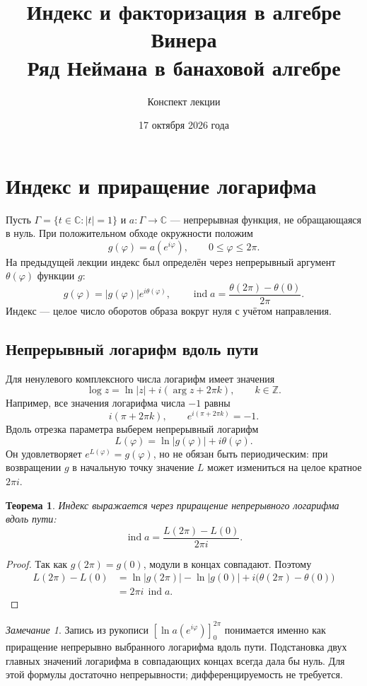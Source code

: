 \documentclass[12pt,a4paper]{article}
\title{Индекс и факторизация в алгебре Винера\\Ряд Неймана в банаховой алгебре}
\author{Конспект лекции}
\date{17 октября 2026 года}
\newtheorem{theorem}{Теорема}
\theoremstyle{definition}
\theoremstyle{remark}
\newtheorem*{remark}{Замечание}
\newcommand{\CC}{\mathbb{C}}
\newcommand{\ZZ}{\mathbb{Z}}
\DeclareMathOperator{\ind}{ind}
\begin{document}
\maketitle

\section{Индекс и приращение логарифма}

Пусть $\Gamma=\{t\in\CC:|t|=1\}$ и $a\colon\Gamma\to\CC$ ---
непрерывная функция, не обращающаяся в нуль. При положительном обходе
окружности положим
\[
  g(\varphi)=a(e^{i\varphi}),\qquad 0\leqslant\varphi\leqslant2\pi.
\]
На предыдущей лекции индекс был определён через непрерывный аргумент
$\theta(\varphi)$ функции $g$:
\[
  g(\varphi)=|g(\varphi)|e^{i\theta(\varphi)},\qquad
  \ind a=\frac{\theta(2\pi)-\theta(0)}{2\pi}.
\]
Индекс --- целое число оборотов образа вокруг нуля с учётом направления.

\subsection{Непрерывный логарифм вдоль пути}

Для ненулевого комплексного числа логарифм имеет значения
\[
  \log z=\ln|z|+i(\arg z+2\pi k),\qquad k\in\ZZ.
\]
Например, все значения логарифма числа $-1$ равны
\[
  i(\pi+2\pi k),\qquad
  e^{i(\pi+2\pi k)}=-1.
\]
Вдоль отрезка параметра выберем непрерывный логарифм
\[
  L(\varphi)=\ln|g(\varphi)|+i\theta(\varphi).
\]
Он удовлетворяет $e^{L(\varphi)}=g(\varphi)$, но не обязан быть
периодическим: при возвращении $g$ в начальную точку значение $L$
может измениться на целое кратное $2\pi i$.

\begin{theorem}
Индекс выражается через приращение непрерывного логарифма вдоль пути:
\[
  \boxed{\ind a=\frac{L(2\pi)-L(0)}{2\pi i}}.
\]
\end{theorem}

\begin{proof}
Так как $g(2\pi)=g(0)$, модули в концах совпадают. Поэтому
\begin{align*}
  L(2\pi)-L(0)
  &=\ln|g(2\pi)|-\ln|g(0)|
    +i\bigl(\theta(2\pi)-\theta(0)\bigr)\\
  &=2\pi i\,\ind a.
\end{align*}
\end{proof}

\begin{remark}
Запись из рукописи $[\ln a(e^{i\varphi})]_0^{2\pi}$ понимается
именно как приращение непрерывно выбранного логарифма вдоль пути.
Подстановка двух главных значений логарифма в совпадающих концах
всегда дала бы нуль. Для этой формулы достаточно непрерывности;
дифференцируемость не требуется.
\end{remark}
\end{document}
